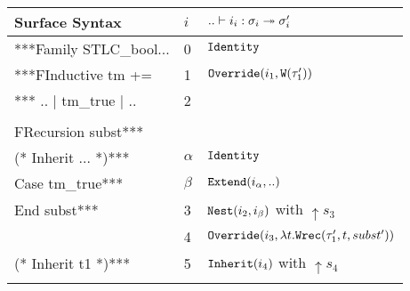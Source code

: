 \begin{table}[]
  \begin{tabular}{|l|l|l|}
  \hline
  \rowcolor[HTML]{FFFFE6} 
  Surface Syntax          & $i$      & $ {..} \vdash {i_i} : {\sigma_i} \twoheadrightarrow {\sigma_i'}$             \\ \hline
  ***Family STLC\_bool... & 0        & $\texttt{Identity}$                                             \\ \cline{2-3} 
  ***FInductive tm +=     & 1        & $\texttt{Override}({i_1},{\texttt{W}({\tau_1'})})$                      \\ \cline{2-3} 
  *** .. | tm\_true | ..  & 2        &                                                      \\
                          &          &                                                      \\ \cline{2-3} 
  FRecursion subst***     &          &                                                      \\ \cline{2-3} 
  \rowcolor[HTML]{E0D7D7} 
  (* Inherit ... *)***    & $\alpha$ & $\texttt{Identity}$                                             \\ \cline{2-3} 
  \rowcolor[HTML]{E0D7D7} 
  Case tm\_true***        & $\beta$  & $\texttt{Extend}({i_\alpha},{..})$                              \\ \cline{2-3} 
  End subst***            & 3        & $\texttt{Nest}({i_2},{i_\beta})$ with $\uparrow s_3$         \\ \cline{2-3} 
                          & 4        & $\texttt{Override}({i_3},{\lambda t. \texttt{Wrec}({\tau_1'},{t},{subst'})})$ \\ \cline{2-3} 
  (* Inherit t1 *)***     & 5        & $\texttt{Inherit}({i_4})$ with $\uparrow s_4$                   \\
                          &          &                                                      \\ \hline
  \end{tabular}
  \end{table}
